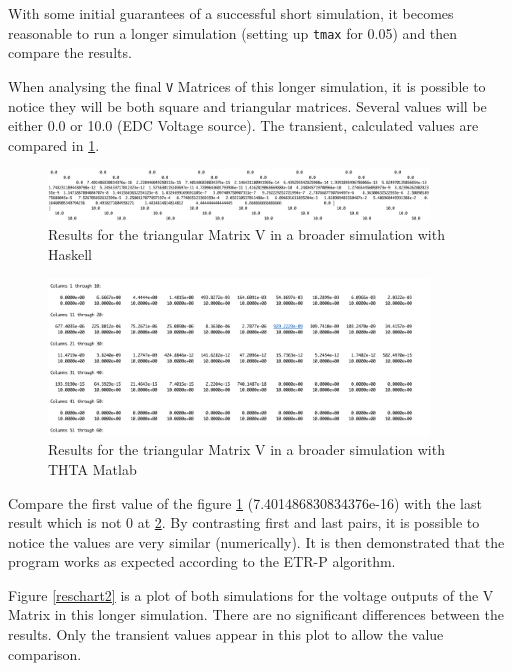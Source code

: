 With some initial guarantees of a successful short simulation, it becomes reasonable to run a longer simulation (setting up \lstinline!tmax! for 0.05) and then compare the results. 

When analysing the final \lstinline!V! Matrices of this longer simulation, it is possible to notice they will be both square and triangular matrices. Several values will be either 0.0 or 10.0 (EDC Voltage source). The transient, calculated values are compared in \ref{fig:haskellvmatrfinal}.

\begin{figure}[H]
   \centering
   \includegraphics[width=0.9\textwidth]{img/results_Haskell.png}
   \caption{Results for the triangular Matrix V in a broader simulation with Haskell}
   \label{fig:haskellvmatrfinal}
\end{figure}


\begin{figure}[H]
   \centering
   \includegraphics[width=0.9\textwidth]{img/results_THTA_Matlab.png}
   \caption{Results for the triangular Matrix V in a broader simulation with THTA Matlab}
   \label{matlabvmatrfinal}
\end{figure}

Compare the first value of the figure \ref{fig:haskellvmatrfinal} (7.401486830834376e-16) with the last result which is not 0 at \ref{matlabvmatrfinal}. By contrasting first and last pairs, it is possible to notice the values are very similar (numerically). It is then demonstrated that the program works as expected according to the ETR-P algorithm.


Figure \ref{reschart2} is a plot of both simulations for the voltage outputs of the V Matrix in this longer simulation. There are no significant differences between the results. Only the transient values appear in this plot to allow the value comparison.


